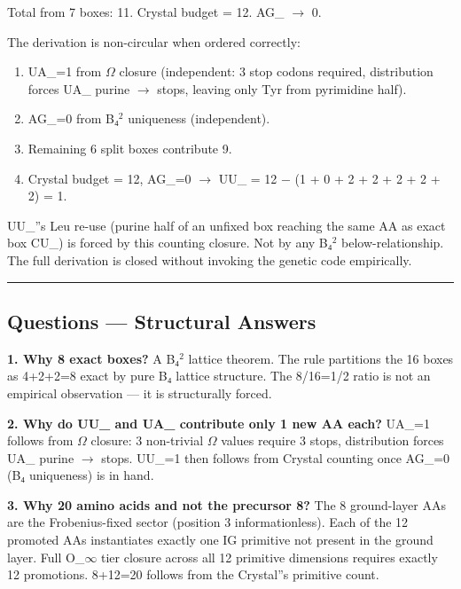 \documentclass[12pt,a4paper]{article}
\begin{document}
Total from 7 boxes: 11. Crystal budget = 12. AG\_ $\rightarrow$ 0.

The derivation is non-circular when ordered correctly:

\begin{enumerate}
    \item UA\_=1 from $\Omega$ closure (independent: 3 stop codons required, distribution forces UA\_ purine $\rightarrow$ stops, leaving only Tyr from pyrimidine half).
    \item AG\_=0 from B₄$^{2}$ uniqueness (independent).
    \item Remaining 6 split boxes contribute 9.
    \item Crystal budget = 12, AG\_=0 $\rightarrow$ UU\_ = 12 $-$ (1 + 0 + 2 + 2 + 2 + 2 + 2) = 1.
\end{enumerate}

UU\_''s Leu re-use (purine half of an unfixed box reaching the same AA as exact box CU\_) is forced by this counting closure. Not by any B₄$^{2}$ below-relationship. The full derivation is closed without invoking the genetic code empirically.

\begin{center}
\rule{0.5\textwidth}{0.4pt}
\end{center}

\subsection{Questions --- Structural Answers}

\textbf{1. Why 8 exact boxes?} A B₄$^{2}$ lattice theorem. The rule partitions the 16 boxes as 4+2+2=8 exact by pure B₄ lattice structure. The 8/16=1/2 ratio is not an empirical observation --- it is structurally forced.

\textbf{2. Why do UU\_ and UA\_ contribute only 1 new AA each?} UA\_=1 follows from $\Omega$ closure: 3 non-trivial $\Omega$ values require 3 stops, distribution forces UA\_ purine $\rightarrow$ stops. UU\_=1 then follows from Crystal counting once AG\_=0 (B₄ uniqueness) is in hand.

\textbf{3. Why 20 amino acids and not the precursor 8?} The 8 ground-layer AAs are the Frobenius-fixed sector (position 3 informationless). Each of the 12 promoted AAs instantiates exactly one IG primitive not present in the ground layer. Full O\_$\infty$ tier closure across all 12 primitive dimensions requires exactly 12 promotions. 8+12=20 follows from the Crystal''s primitive count.
\end{document}
